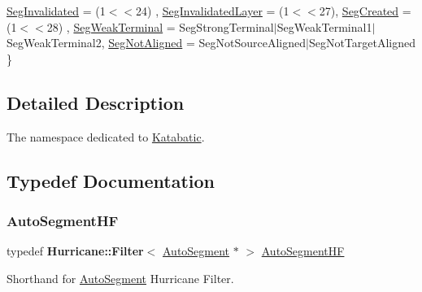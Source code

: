 \begin{DoxyCompactItemize}
\newline
\mbox{\hyperlink{namespaceKatabatic_a94585537ee1724ea9315578ec54380f4a3c1d76fecee6a8bd5e12ce3fec013827}{Seg\+Invalidated}} = (1$<$$<$24)
, \newline
\mbox{\hyperlink{namespaceKatabatic_a94585537ee1724ea9315578ec54380f4a11c86dd3185eb251b2f3ce536cc2ab34}{Seg\+Invalidated\+Layer}} = (1$<$$<$27), 
\newline
\mbox{\hyperlink{namespaceKatabatic_a94585537ee1724ea9315578ec54380f4a01513b74d37a8721370cf7b91fb419ad}{Seg\+Created}} = (1$<$$<$28)
, \newline
\mbox{\hyperlink{namespaceKatabatic_a94585537ee1724ea9315578ec54380f4a419e7722198b077c1f71d6c47e2fc2ab}{Seg\+Weak\+Terminal}} = Seg\+Strong\+Terminal$\vert$\+Seg\+Weak\+Terminal1$\vert$\+Seg\+Weak\+Terminal2, 
\newline
\mbox{\hyperlink{namespaceKatabatic_a94585537ee1724ea9315578ec54380f4a637e0426170a532feac45548e009325d}{Seg\+Not\+Aligned}} = Seg\+Not\+Source\+Aligned$\vert$\+Seg\+Not\+Target\+Aligned
 \}
\end{DoxyCompactItemize}


\subsection{Detailed Description}
The namespace dedicated to \mbox{\hyperlink{namespaceKatabatic}{Katabatic}}. 

\subsection{Typedef Documentation}
\mbox{\label{namespaceKatabatic_a790418bb65a9a13859868df3e8f53598}} 
\subsubsection{\texorpdfstring{Auto\+Segment\+HF}{AutoSegmentHF}}
{\footnotesize\ttfamily typedef \textbf{ Hurricane\+::\+Filter}$<$ \mbox{\hyperlink{classKatabatic_1_1AutoSegment}{Auto\+Segment}} $\ast$ $>$ \mbox{\hyperlink{namespaceKatabatic_a790418bb65a9a13859868df3e8f53598}{Auto\+Segment\+HF}}}

Shorthand for \mbox{\hyperlink{classKatabatic_1_1AutoSegment}{Auto\+Segment}} Hurricane Filter. \mbox{\label{namespaceKatabatic_a40ef13471fd0e797b75d3c436813fe65}} 
